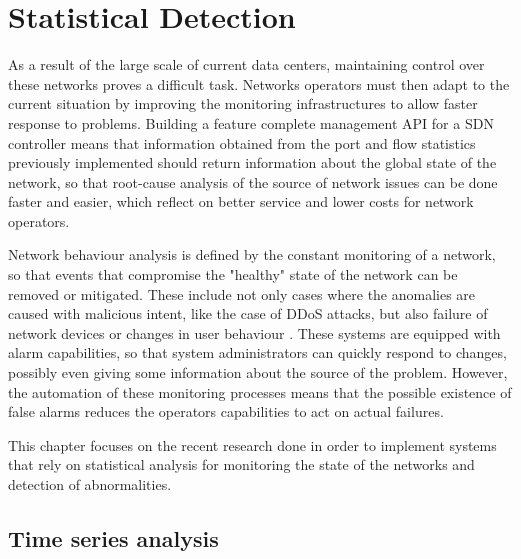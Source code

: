 \section{Statistical Detection} \label{chap:stat_det}

As a result of the large scale of current data centers, maintaining control over these networks proves a difficult task. Networks operators must then adapt to the current situation by improving the monitoring infrastructures 
to allow faster response to problems.  Building a feature complete management API for a SDN controller means that information obtained from the port and flow statistics previously implemented should return information 
about the global state of the network, so that root-cause analysis of the source of network issues can be done faster and easier, which reflect on better service and lower costs for network operators. 
\par Network behaviour analysis is defined by the constant monitoring of a network, so that events that compromise the "healthy" state of the network can be removed or mitigated. These include not only cases where the anomalies are
caused with malicious intent, like the case of DDoS attacks, but also failure of network devices or changes in user behaviour \cite{munz_traffic_2010}. These systems are equipped with alarm capabilities, so that 
system administrators can quickly respond to changes, possibly even giving some information about the source of the problem. However, the automation of these monitoring processes means that the possible existence
of false alarms reduces the operators capabilities to act on actual failures. 
\par This chapter focuses on the recent research done in order to implement systems that rely on statistical analysis for monitoring the state of the networks and detection of abnormalities.

\subsection {Time series analysis}

